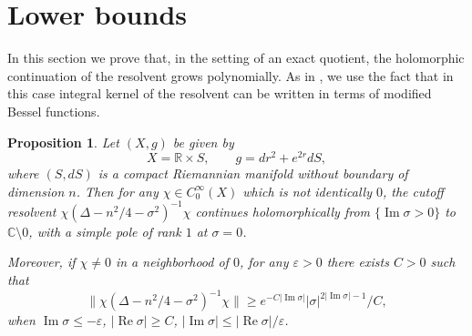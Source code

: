 \documentclass[reqno, 12pt]{amsart}
\newcommand \R {\mathbb{R}}
\newcommand \C {\mathbb{C}}
\newcommand \eps {\varepsilon}
\DeclareMathOperator \re {Re}
\DeclareMathOperator \im {Im}
\newtheorem{prop}{Proposition}
\theoremstyle{definition}
\numberwithin{equation}{section}
\numberwithin{prop}{section}
\numberwithin{figure}{section}
\begin{document}
\section{Lower bounds}\label{s:low}
In this section we prove that, in the setting of an exact quotient, the holomorphic continuation of the resolvent grows  polynomially. As in \cite[\S 5.3]{b}, we use the fact that in this case integral kernel of the resolvent can be written in terms of modified Bessel functions.

\begin{prop}\label{p:bessel}
Let $(X,g)$ be given by 
\[
X = \R \times S, \qquad g = dr^2 + e^{2r}dS,
\]
 where $(S,dS)$ is a compact Riemannian manifold without boundary of dimension $n$. Then for any $\chi \in C_0^\infty(X)$ which is not identically $0$, the cutoff resolvent $\chi(\Delta - n^2/4 - \sigma^2)^{-1}\chi $ continues holomorphically from $\{\im \sigma > 0\}$ to $\C \setminus 0$, with a simple pole of rank $1$ at $\sigma = 0$. 
 
 Moreover, if $\chi \ne 0$ in a neighborhood of $0$, for any $\eps > 0$ there exists $ C>0$ such that
\[
\|\chi(\Delta - n^2/4 - \sigma^2)^{-1}\chi\| \ge e^{-C|\im\sigma|} |\sigma|^{2|\im\sigma|-1}/C,
\]
when $\im \sigma \le -\eps$, $|\re \sigma| \ge C$, $|\im\sigma|\le |\re\sigma|/\eps$.
\end{prop}
\end{document}
